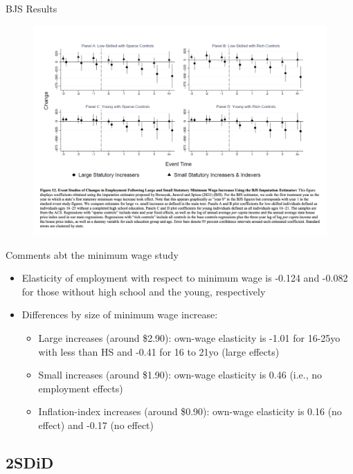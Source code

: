 \documentclass{beamer}
\begin{document}
\begin{frame}{BJS Results}

	\begin{figure}
	\includegraphics[scale=0.25]{./lecture_includes/Clemens_bjs_2.png}
	\end{figure}

\end{frame}

\begin{frame}{Comments abt the minimum wage study}

\begin{itemize}
\item Elasticity of employment with respect to minimum wage is -0.124 and -0.082 for those without high school and the young, respectively
\item Differences by size of minimum wage increase:
	\begin{itemize}
	\item Large increases (around \$2.90): own-wage elasticity is -1.01 for 16-25yo with less than HS and -0.41 for 16 to 21yo (large effects)
	\item Small increases (around \$1.90): own-wage elasticity is 0.46 (i.e., no employment effects)
	\item Inflation-index increases (around \$0.90): own-wage elasticity is 0.16 (no effect) and -0.17 (no effect)
	\end{itemize}
\end{itemize}

\end{frame}

\subsection{2SDiD}
\end{document}
